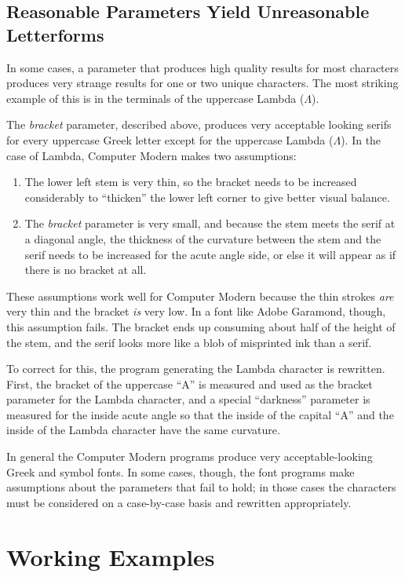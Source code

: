 \documentclass[12pt]{article}
\begin{document}
\subsection{Reasonable Parameters Yield Unreasonable Letterforms}

In some cases, a parameter that produces high quality results for most
characters produces very strange results for one or two unique characters. The
most striking example of this is in the terminals of the uppercase Lambda
($\Lambda$).

The \emph{bracket} parameter, described above, produces very acceptable looking
serifs for every uppercase Greek letter except for the uppercase Lambda
($\Lambda$). In the case of Lambda, Computer Modern makes two assumptions:
\begin{enumerate}
\item The lower left stem is very thin, so the bracket needs to be increased
considerably to ``thicken'' the lower left corner to give better visual balance.
\item The \emph{bracket} parameter is very small, and because the stem meets the
serif at a diagonal angle, the thickness of the curvature between the stem and
the serif needs to be increased for the acute angle side, or else it will appear
as if there is no bracket at all.
\end{enumerate}
These assumptions work well for Computer Modern because the thin strokes
\emph{are} very thin and the bracket \emph{is} very low. In a font like Adobe
Garamond, though, this assumption fails. The bracket ends up consuming about
half of the height of the stem, and the serif looks more like a blob of
misprinted ink than a serif.

To correct for this, the program generating the Lambda character is rewritten.
First, the bracket of the uppercase ``A'' is measured and used as the bracket
parameter for the Lambda character, and a special ``darkness'' parameter is
measured for the inside acute angle so that the inside of the capital ``A'' and
the inside of the Lambda character have the same curvature.

In general the Computer Modern programs produce very acceptable-looking Greek
and symbol fonts. In some cases, though, the font programs make assumptions
about the parameters that fail to hold; in those cases the characters must be
considered on a case-by-case basis and rewritten appropriately.


\section{Working Examples}
\end{document}
